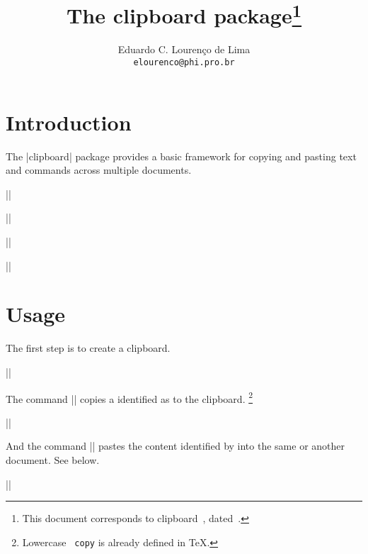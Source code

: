 \documentclass{ltxdoc}
\title  {The \textsf{clipboard} package\thanks{This document corresponds to \textsf{clipboard}~\fileversion, dated~\filedate.}}
\author {Eduardo C. Louren\c{c}o de Lima\\\texttt{elourenco@phi.pro.br}}
\date   {\filedate}
\newenvironment{Description}
 {\par\medskip\noindent\ignorespaces}{}
\newenvironment{synopsis}
 {\begin{list}{}{\setlength\parsep{0pt}\setlength\itemsep{0pt}}}
 {\end{list}}
\begin{document}
                                   \maketitle

                            \section*{Introduction}

The |clipboard| package provides a basic framework for copying and pasting text and commands across multiple documents.

\begin{synopsis}
\item |\newclipboard | 
\item |\openclipboard| \medskip
\item |\Copy |          
\item |\Paste|         
\end{synopsis}

                                \section{Usage}

\begin{Description}
\DescribeMacro{\newclipboard}
The first step is to create a clipboard.
\begin{synopsis}
\item |\newclipboard| 
\end{synopsis}
\end{Description}

\begin{Description}
\DescribeMacro{\Copy}
The command |\Copy| copies a  identified as  to the clipboard.
\footnote {Lowercase \texttt{ copy} is already defined in {\TeX}.}
\begin{synopsis}
\item |\Copy|  
\end{synopsis}
\end{Description}

\begin{Description}
\DescribeMacro{\Paste}
And the command |\Paste| pastes the content identified by  into the same or another document.
See below.
\begin{synopsis}
\item |\Paste| 
\end{synopsis}
\end{Description}
\end{document}
